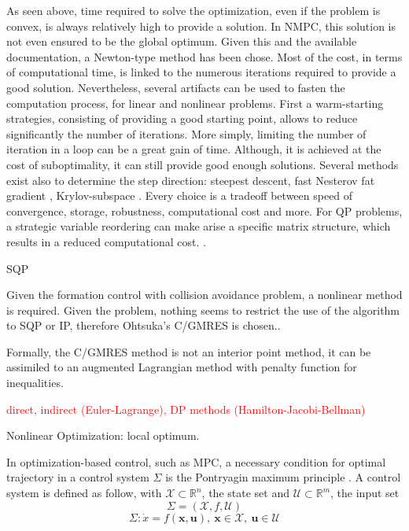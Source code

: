 \documentclass[a4paper, 12pt]{report}
\begin{document}
As seen above, time required to solve the optimization, even if the problem is convex, is always relatively high to provide a solution. In NMPC, this solution is not even ensured to be the global optimum. Given this and the available documentation, a Newton-type method has been chose. Most of the cost, in terms of computational time, is linked to the numerous iterations required to provide a good solution. Nevertheless, several artifacts can be used to fasten the computation process, for linear and nonlinear problems. First a warm-starting strategies, consisting of providing a good starting point, allows to reduce significantly the number of iterations. More simply, limiting the number of iteration in a loop can be a great gain of time. Although, it is achieved at the cost of suboptimality, it can still provide good enough solutions. Several methods exist also to determine the step direction: steepest descent, fast Nesterov fat gradient \cite{Richter2012}, Krylov-subspace \cite{Ohtsuka2004}. Every choice is a tradeoff between speed of convergence, storage, robustness, computational cost and more. For QP problems, a strategic variable reordering can make arise a specific matrix structure, which results in a reduced computational cost. \cite{Wang2008}.

SQP \cite{Tenny2002}

Given the formation control with collision avoidance problem, a nonlinear method is required. Given the problem, nothing seems to restrict the use of the algorithm to SQP or IP, therefore Ohtsuka's C/GMRES is chosen.\cite{Ohtsuka2004}.

Formally, the C/GMRES method is not an interior point method, it can be assimiled to an augmented Lagrangian method with penalty function for inequalities.

\textcolor{red}{direct, indirect (Euler-Lagrange), DP methods (Hamilton-Jacobi-Bellman)}

Nonlinear Optimization: local optimum.


In optimization-based control, such as MPC, a necessary condition for optimal trajectory in a control system $\Sigma$ is the Pontryagin maximum principle \cite{Pontryagin1987, Lewis2006, Murray2010}. A control system is defined as follow, with $\mathcal{X} \subset \mathbb{R}^n$, the state set and $\mathcal{U} \subset \mathbb{R}^m$, the input set
\[ \Sigma = (\mathcal{X}, f, \mathcal{U}) \]
\[ \Sigma: \dot x = f(\boldsymbol{x}, \boldsymbol{u}),\ \boldsymbol{x} \in \mathcal{X},\ \boldsymbol{u} \in \mathcal{U} \]
\end{document}
